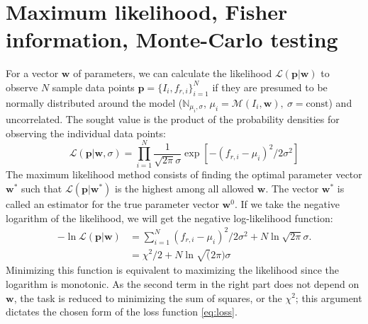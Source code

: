\documentclass[%
 aip,
 draft,
 amsmath,amssymb,
 reprint,%
]{revtex4-1}
\begin{document}
\section{Maximum likelihood, Fisher information, Monte-Carlo testing}\label{sec:ML}

	
For a vector $\mathbf{w}$ of parameters, we can calculate the likelihood $ \mathcal{L}(\mathbf{p}|\mathbf{w}) $ to observe $N$ sample data points $\mathbf{p} = \{I_i, f_{r,i}\}_{i=1}^N$ if they are presumed to be normally distributed around the model ($\mathbb{N}_{\mu_i, \sigma}$, $\mu_i = \mathcal{M}(I_i, \mathbf{w}),\ \sigma = \text{const}$) and uncorrelated. The sought value is the product of the probability densities for observing the individual data points:
\begin{equation}
\mathcal{L}(\mathbf{p}|\mathbf{w}, \sigma) = \prod_{i=1}^{N} \frac{1}{\sqrt{2\pi}\sigma} \exp[ -(f_{r,i} - \mu_i)^2 / 2 \sigma^2]\label{eq:MLE} 
\end{equation}
The maximum likelihood method consists of finding the optimal parameter vector $\mathbf{w}^*$ such that $ \mathcal{L}(\mathbf{p}|\mathbf{w}^*) $ is the highest among all allowed $\mathbf{w} $. The vector $\mathbf{w}^*$ is called an estimator for the true parameter vector $\mathbf{w}^0$. If we take the negative logarithm of the likelihood, we will get the negative log-likelihood function:
\begin{align*}
- \ln \mathcal{L}(\mathbf{p}|\mathbf{w}) &= \sum_{i=1}^N (f_{r,i} - \mu_i)^2 / 2 \sigma^2 + N \ln\sqrt{2\pi}\sigma.
\label{eq:logL} \\
&= \chi^2/2 + N\ln \sqrt(2\pi)\sigma
\end{align*}
Minimizing this function is equivalent to maximizing the likelihood since the logarithm is monotonic. As the second term in the right part does not depend on $\mathbf{w}$, the task is reduced to minimizing the sum of squares, or the $\chi^2$; this argument dictates the chosen form of the loss function \eqref{eq:loss}. 
\end{document}
